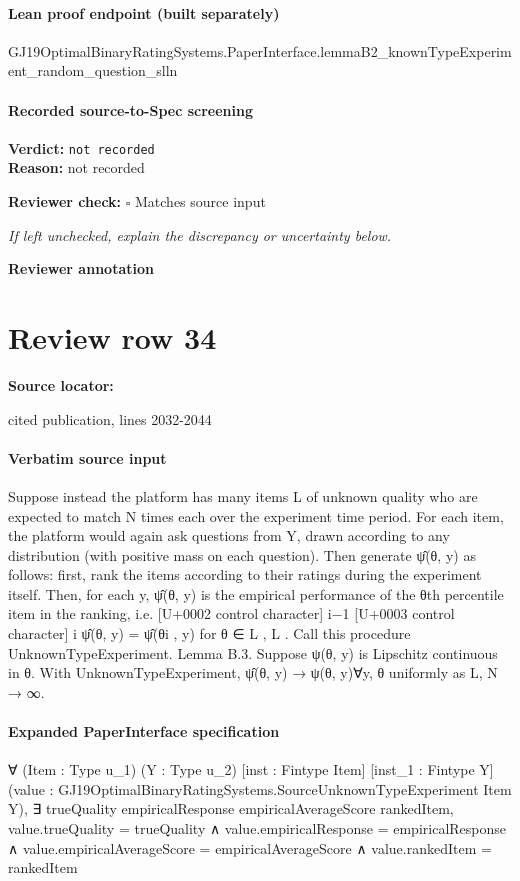 \documentclass[10pt]{article}
\newcommand{\reviewerbox}{%
  \par\noindent\fbox{\parbox{0.96\linewidth}{\rule{0pt}{0.38in}}}\par
}
\newcommand{\reviewmatch}[1]{%
  \par\noindent\textbf{Reviewer check:} $\square$\; #1\par
  \noindent\emph{If left unchecked, explain the discrepancy or uncertainty below.}\par
}
\begin{document}
\paragraph{Lean proof endpoint (built separately)}\begin{ReviewVerbatim}
GJ19OptimalBinaryRatingSystems.PaperInterface.lemmaB2_knownTypeExperiment_random_question_slln
\end{ReviewVerbatim}

\paragraph{Recorded source-to-Spec screening}
\textbf{Verdict:} \texttt{not recorded}
\\
\textbf{Reason:} not recorded
\reviewmatch{Matches source input}
\noindent\textbf{Reviewer annotation}\par
\reviewerbox
\clearpage
\hypertarget{source-claim-e38b113829a05c8d}{}
\section*{Review row 34}
\textbf{Source locator:} {\footnotesize\raggedright cited publication, lines 2032-\allowbreak{}2044\par}
\paragraph{Verbatim source input}
\begin{ReviewVerbatim}
Suppose instead the platform has many items L of unknown quality who are expected to match N
times each over the experiment time period. For each item, the platform would again ask questions
from Y, drawn according to any distribution (with positive mass on each question). Then generate
ψ̂(θ, y) as follows: first, rank the items according to their ratings during the experiment itself.
Then, for each y, ψ̂(θ, y) is
the empirical
performance of the θth percentile item in the ranking, i.e.
[U+0002 control character] i−1
[U+0003 control character]
i
ψ̂(θ, y) = ψ̂(θi , y) for θ ∈ L , L . Call this procedure UnknownTypeExperiment.
Lemma B.3. Suppose ψ(θ, y) is Lipschitz continuous in θ. With UnknownTypeExperiment, ψ̂(θ, y) →
ψ(θ, y)∀y, θ uniformly as L, N → ∞.
\end{ReviewVerbatim}


\paragraph{Expanded PaperInterface specification}
\begin{ReviewVerbatim}
∀ (Item : Type u_1) (Y : Type u_2) [inst : Fintype Item] [inst_1 : Fintype Y]
  (value : GJ19OptimalBinaryRatingSystems.SourceUnknownTypeExperiment Item Y),
  ∃ trueQuality empiricalResponse empiricalAverageScore rankedItem,
    value.trueQuality = trueQuality ∧
      value.empiricalResponse = empiricalResponse ∧
        value.empiricalAverageScore = empiricalAverageScore ∧ value.rankedItem = rankedItem
\end{ReviewVerbatim}
\end{document}
